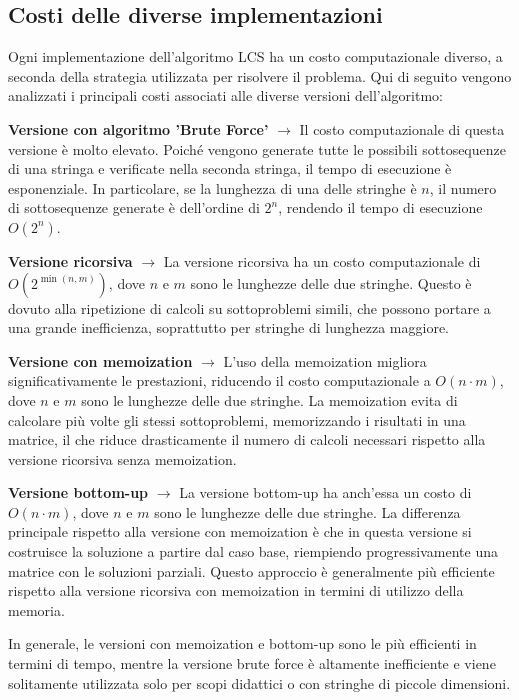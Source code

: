 \begin{ORANGEBOX}
		\subsection{Costi delle diverse implementazioni}
	Ogni implementazione dell'algoritmo LCS ha un costo computazionale diverso, a seconda della strategia utilizzata per risolvere il problema. Qui di seguito vengono analizzati i principali costi associati alle diverse versioni dell'algoritmo:
	
	\begin{DESC}{1} 
		\item[\textbf{Versione con algoritmo 'Brute Force'}] $\rightarrow$ Il costo computazionale di questa versione è molto elevato. Poiché vengono generate tutte le possibili sottosequenze di una stringa e verificate nella seconda stringa, il tempo di esecuzione è esponenziale. In particolare, se la lunghezza di una delle stringhe è $n$, il numero di sottosequenze generate è dell'ordine di $2^n$, rendendo il tempo di esecuzione $O(2^n)$.
		\item[\textbf{Versione ricorsiva}] $\rightarrow$ La versione ricorsiva ha un costo computazionale di $O(2^{\min(n, m)})$, dove $n$ e $m$ sono le lunghezze delle due stringhe. Questo è dovuto alla ripetizione di calcoli su sottoproblemi simili, che possono portare a una grande inefficienza, soprattutto per stringhe di lunghezza maggiore.
		\item[\textbf{Versione con memoization}] $\rightarrow$ L'uso della memoization migliora significativamente le prestazioni, riducendo il costo computazionale a $O(n \cdot m)$, dove $n$ e $m$ sono le lunghezze delle due stringhe. La memoization evita di calcolare più volte gli stessi sottoproblemi, memorizzando i risultati in una matrice, il che riduce drasticamente il numero di calcoli necessari rispetto alla versione ricorsiva senza memoization.
		\item[\textbf{Versione bottom-up}] $\rightarrow$ La versione bottom-up ha anch'essa un costo di $O(n \cdot m)$, dove $n$ e $m$ sono le lunghezze delle due stringhe. La differenza principale rispetto alla versione con memoization è che in questa versione si costruisce la soluzione a partire dal caso base, riempiendo progressivamente una matrice con le soluzioni parziali. Questo approccio è generalmente più efficiente rispetto alla versione ricorsiva con memoization in termini di utilizzo della memoria.
	\end{DESC}
	In generale, le versioni con memoization e bottom-up sono le più efficienti in termini di tempo, mentre la versione brute force è altamente inefficiente e viene solitamente utilizzata solo per scopi didattici o con stringhe di piccole dimensioni.
	

\end{ORANGEBOX}
